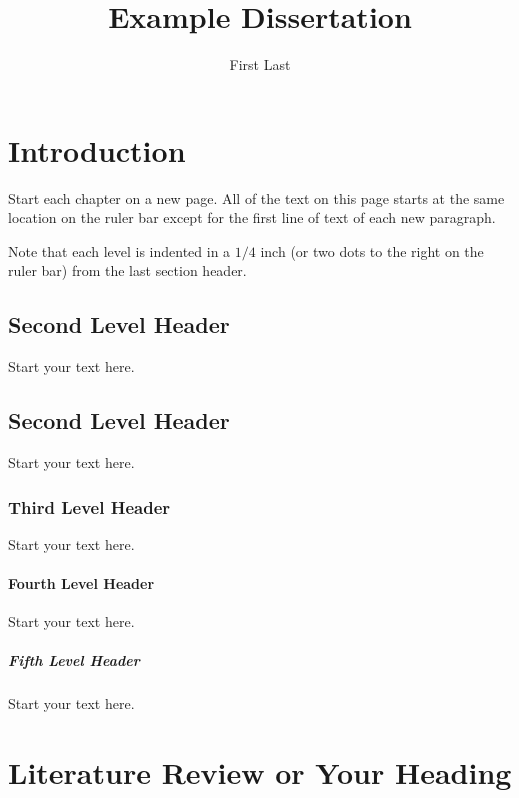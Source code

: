 \documentclass[debug, font=Times]{gw-dissertation}[2021/11/19]
\title{Example Dissertation}
\author{First Last}
\begin{document}
\chapter{Introduction}

Start each chapter on a new page. All of the text on this page starts at the same location on the
ruler bar except for the first line of text of each new paragraph.

Note that each level is indented in a $1/4$ inch (or two dots to the right on the ruler bar) from
the last section header. 

    \section{Second Level Header}
    Start your text here.

    \section{Second Level Header}
    Start your text here.

        \subsection{Third Level Header}
        Start your text here.

            \subsubsection{Fourth Level Header}
            Start your text here.

                \paragraph{Fifth Level Header}
                Start your text here.

\chapter{Literature Review or Your Heading}
\end{document}
